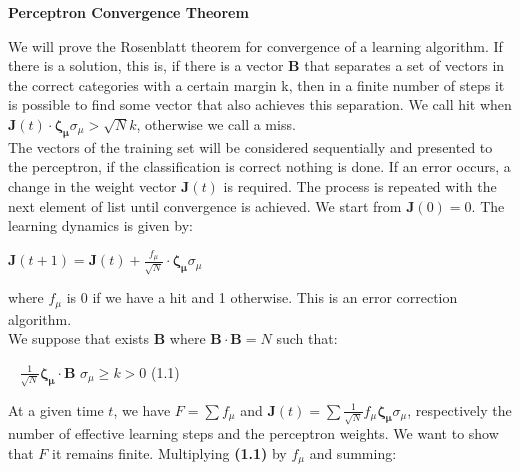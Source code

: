 \documentclass[paper=9in:6in,pagesize=pdftex,headinclude=on,footinclude=on,10pt,bibtotoc,pointlessnumbers,normalheadings,DIV=9,twoside=false]{scrbook}
\begin{document}
\date{}

\begin{center}
\begin{large}
 \textbf{Perceptron Convergence Theorem\\}
\end{large}
\end{center}
\begin{text} 
We will prove the Rosenblatt theorem for convergence
of a learning algorithm. If there is a solution, this is,
if there is a vector \textbf{B} that separates a set of vectors in the correct categories with a certain margin k, then in a finite number of steps it is possible to find some vector that also achieves this separation. We call hit when $\textbf{J}(t)\cdot \boldsymbol{\zeta_{\mu}}\sigma_{\mu} > \sqrt{N}k$, otherwise we call a miss. \\

The vectors of the training set will be considered sequentially and presented to the perceptron, if the classification is correct nothing is done. If an error occurs, a change in the weight vector
$\mathbf{J} (t)$ is required. The process is repeated with the next element of list until convergence is achieved. We start from $ \mathbf{J}(0) = 0$. The learning dynamics is given by:\\
\end{text}

\begin{center}
    $\mathbf{J}(t+1) = \mathbf{J}(t) + \frac{f_\mu}{\sqrt{N}} \cdot  \boldsymbol{\zeta_{\mu}}\sigma_{\mu}$
\end{center}

\begin{text}
where $f_\mu$ is 0 if we have a hit and 1 otherwise. This is an error correction algorithm. \\

We suppose that exists $\mathbf{B}$ where $\mathbf{B} \cdot \mathbf{B}=N$ such that: \\


\end{text}


\begin{text}
  \ \hspace{1.5in} $\frac{1}{\sqrt{N}}\boldsymbol{\zeta_{\mu}}\cdot \mathbf{B}$ $\sigma_{\mu} \geq k > 0 $  \hspace{3cm} (1.1) \\
\end{text}

\begin{text}
At a given time $t$, we have $F = \sum f_{\mu}$ and $\mathbf{J} (t) =  \sum \frac{1}{\sqrt{N}} f_{\mu} \boldsymbol{\zeta_{\mu}}\sigma_{\mu}$, respectively the number of effective learning steps and the perceptron weights. We want to show that $F$ it remains finite. Multiplying \textbf{(1.1)} by $f_{\mu} $ and summing:  
\end{text}
\end{document}
